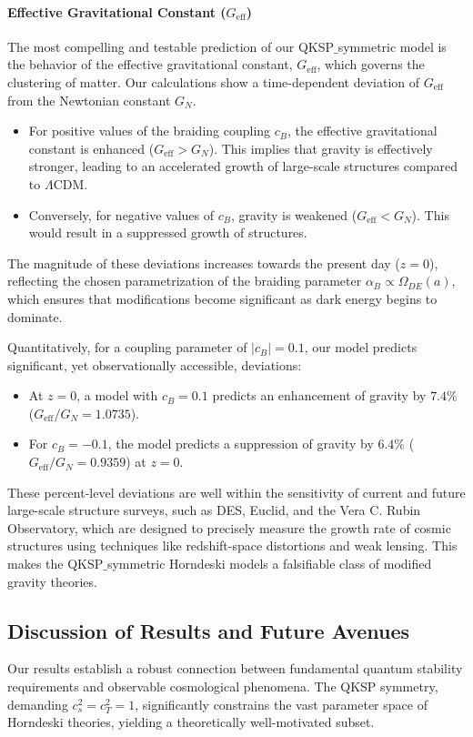 \documentclass[twocolumn]{aastex631}
\begin{document}
\paragraph{Effective Gravitational Constant ($G_{\text{eff}}$)}
The most compelling and testable prediction of our QKSP\ensuremath{\_}symmetric model is the behavior of the effective gravitational constant, $G_{\text{eff}}$, which governs the clustering of matter. Our calculations show a time-dependent deviation of $G_{\text{eff}}$ from the Newtonian constant $G_N$.
\begin{itemize}
    \item For positive values of the braiding coupling $c_B$, the effective gravitational constant is enhanced ($G_{\text{eff}} > G_N$). This implies that gravity is effectively stronger, leading to an accelerated growth of large-scale structures compared to $\Lambda$CDM.
    \item Conversely, for negative values of $c_B$, gravity is weakened ($G_{\text{eff}} < G_N$). This would result in a suppressed growth of structures.
\end{itemize}
The magnitude of these deviations increases towards the present day ($z=0$), reflecting the chosen parametrization of the braiding parameter $\alpha_B \propto \Omega_{DE}(a)$, which ensures that modifications become significant as dark energy begins to dominate.

Quantitatively, for a coupling parameter of $|c_B|=0.1$, our model predicts significant, yet observationally accessible, deviations:
\begin{itemize}
    \item At $z=0$, a model with $c_B = 0.1$ predicts an enhancement of gravity by $7.4\%$ ($G_{\text{eff}}/G_N = 1.0735$).
    \item For $c_B = -0.1$, the model predicts a suppression of gravity by $6.4\%$ ($G_{\text{eff}}/G_N = 0.9359$) at $z=0$.
\end{itemize}
These percent-level deviations are well within the sensitivity of current and future large-scale structure surveys, such as DES, Euclid, and the Vera C. Rubin Observatory, which are designed to precisely measure the growth rate of cosmic structures using techniques like redshift-space distortions and weak lensing. This makes the QKSP\ensuremath{\_}symmetric Horndeski models a falsifiable class of modified gravity theories.

\subsection{Discussion of Results and Future Avenues}
Our results establish a robust connection between fundamental quantum stability requirements and observable cosmological phenomena. The QKSP symmetry, demanding $c_s^2 = c_T^2 = 1$, significantly constrains the vast parameter space of Horndeski theories, yielding a theoretically well-motivated subset.
\end{document}

